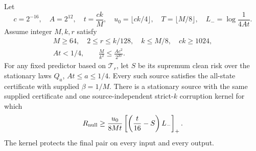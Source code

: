 \begin{proposition}
\label{prop:finite-lower}
Let
\[
 c=2^{-16},\quad A=2^{12},\quad t=\frac{ck}{M},\quad
 u_0=\lfloor ck/4\rfloor,\quad T=\lfloor M/8\rfloor,\quad
 L_-=\log\frac1{4At}.
\]
Assume integer $M,k,r$ satisfy
\begin{equation}
 \begin{gathered}
 M\ge64,\quad 2\le r\le k/128,\quad k\le M/8,\quad ck\ge1024,\\
 At<1/4,\qquad \frac M{k^2}\le\frac{Ac^2}{2^{20}}.
 \end{gathered}\label{eq:finite-lower-domain}
\end{equation}
For any fixed predictor based on $\mathcal T_r$, let $S$ be its supremum
clean risk over the stationary laws $Q_a$, $At\le a\le1/4$.
Every such source satisfies the all-state certificate with supplied
$\beta=1/M$. There is a stationary source with the same supplied
certificate and one source-independent strict-$k$ corruption kernel
for which
\begin{equation}
 R_{\rm null}\ge\frac{u_0}{8Mt}
       \left[\left(\frac t{16}-S\right)L_-\right]_+.
 \label{eq:finite-lower}
\end{equation}
The kernel protects the final pair on every input and every output.
\end{proposition}
